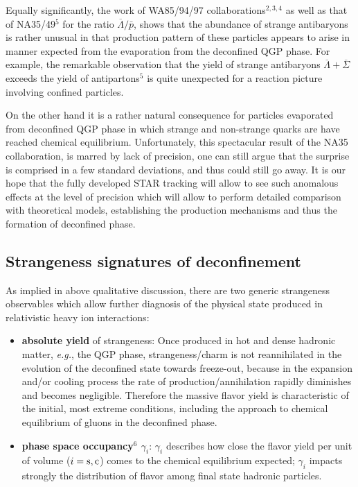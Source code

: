 \begin{mdframed}[linecolor=gray,roundcorner=12pt,backgroundcolor=Dandelion!15,linewidth=1pt,leftmargin=0cm,rightmargin=0cm,topline=true,bottomline=true,skipabove=12pt]
Equally significantly, the work of WA85/94/97 collaborations$^{2,3,4}$  as well as that of NA35/49$^{5}$ for the ratio $\overline\Lambda/\bar p$, shows that the abundance of strange antibaryons is rather unusual in that production pattern of these particles appears to arise in manner expected from the evaporation from the deconfined QGP phase. For example, the remarkable observation that the yield of strange antibaryons $\overline{\Lambda}+\overline{\Sigma}$ exceeds the yield of antipartons$^{5}$ is quite unexpected for a reaction picture involving confined particles. 

On the other hand it is a rather natural consequence for particles evaporated from deconfined QGP phase in which strange and non-strange quarks are have reached chemical equilibrium. Unfortunately, this spectacular result of the NA35 collaboration, is marred by lack of precision, one can still argue that the surprise is comprised in a few standard deviations, and thus could still go away. It is  our hope that the fully developed STAR tracking will allow to see such anomalous  effects at the level of precision which  will allow to perform detailed comparison with theoretical models, establishing the production mechanisms and thus the formation of deconfined phase.

\subsection*{Strangeness signatures of deconfinement}
As implied in above qualitative discussion, there are two generic strangeness  observables which allow further diagnosis of the physical state produced in relativistic heavy ion interactions:
\begin{itemize}
\item 
{\bf absolute yield} of strangeness: Once produced in hot and dense hadronic matter, {\it e.g.},  the QGP phase, strangeness/charm is not reannihilated in the evolution of the deconfined state towards freeze-out, because in the expansion and/or cooling process the rate of  production/annihilation rapidly diminishes and becomes negligible.  Therefore the massive flavor yield is characteristic of the initial, most extreme conditions, including the approach to chemical equilibrium of gluons in the deconfined phase.
\item 
{\bf phase space occupancy$^{6}$  $\gamma_{i}$}: $\gamma_{i}$ describes how close the flavor  yield per unit of volume ($i={\rm s,c}$) comes to the chemical equilibrium expected; $\gamma_i$  impacts strongly the distribution of flavor among final state  hadronic particles.
\end{itemize}


\end{mdframed}
